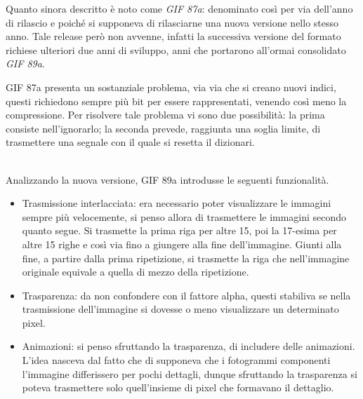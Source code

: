 \documentclass{subfiles}
\begin{document}
Quanto sinora descritto è noto come \emph{GIF 87a}: denominato così per via dell'anno di rilascio e poiché si supponeva di rilasciarne una nuova versione nello stesso anno.
Tale release però non avvenne, infatti la successiva versione del formato richiese ulteriori due anni di sviluppo, anni che portarono all'ormai consolidato \emph{GIF 89a}.

\begin{Remark*}
    GIF 87a presenta un sostanziale problema, via via che si creano nuovi indici, questi richiedono sempre più bit per essere rappresentati,
    venendo così meno la compressione. Per risolvere tale problema vi sono due possibilità: la prima consiste nell'ignorarlo; la seconda prevede, raggiunta una soglia limite,
    di trasmettere una segnale con il quale si resetta il dizionari.
\end{Remark*}
\hfill\\

Analizzando la nuova versione, GIF 89a introdusse le seguenti funzionalità.
\begin{itemize}
    \item Trasmissione interlacciata: era necessario poter visualizzare le immagini sempre più velocemente, si penso allora di trasmettere le immagini secondo quanto segue.
          Si trasmette la prima riga per altre 15, poi la 17-esima per altre 15 righe e così via fino a giungere alla fine dell'immagine.
          Giunti alla fine, a partire dalla prima ripetizione, si trasmette la riga che nell'immagine originale equivale a quella di mezzo della ripetizione.

    \item Trasparenza: da non confondere con il fattore alpha, questi stabiliva se nella trasmissione dell'immagine si dovesse o meno visualizzare un determinato pixel.
    \item Animazioni: si penso sfruttando la trasparenza, di includere delle animazioni.
          L'idea nasceva dal fatto che di supponeva che i fotogrammi componenti l'immagine differissero per pochi dettagli,
          dunque sfruttando la trasparenza si poteva trasmettere solo quell'insieme di pixel che formavano il dettaglio.
\end{itemize}
\clearpage
\end{document}
